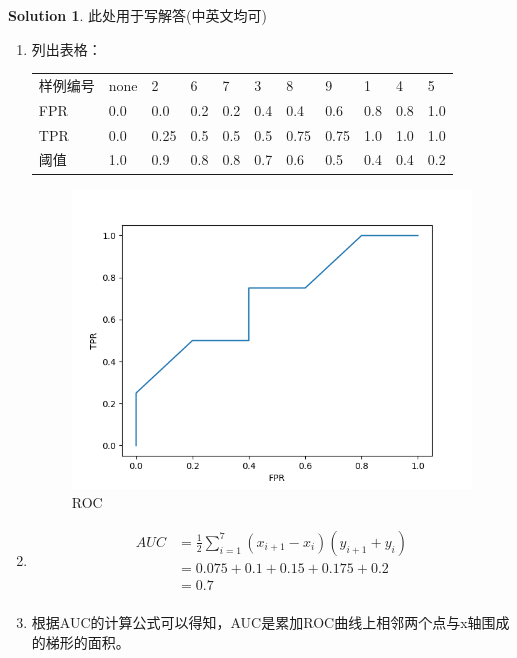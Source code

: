\documentclass[a4paper,UTF8]{article}
\numberwithin{equation}{section}
\theoremstyle{definition}
\newtheorem*{solution}{Solution}
\begin{document}
	\begin{solution}
		此处用于写解答(中英文均可)\\
\begin{enumerate}
\item[(1)]
列出表格：
    \begin{table}[H]
    \label{tab:my-table}
    \begin{tabular}{lllllllllll}
    \cline{1-11}
	样例编号 & none &2 & 6  & 7  & 3 & 8 & 9  & 1  & 4  & 5 \\ \cline{1-11}
    FPR &0.0 & 0.0  & 0.2  & 0.2 & 0.4 & 0.4  & 0.6  & 0.8  & 0.8 & 1.0 \\ \cline{1-11}
    TPR &0.0 & 0.25 & 0.5 & 0.5 & 0.5 & 0.75 & 0.75 & 1.0 & 1.0 & 1.0 \\ \cline{1-11}
    阈值 &1.0 & 0.9  & 0.8  & 0.8 & 0.7 & 0.6  & 0.5  & 0.4  & 0.4 & 0.2 \\ \cline{1-11}
    \end{tabular}
    \end{table}
    \begin{figure}[htbp]
    \centering
    \includegraphics{roc1.jpg}
    \caption{ROC}
    \end{figure}
\newpage 
\item[(2)]
\begin{equation}
	\begin{aligned}
	AUC&= \frac{1}{2}\sum\limits_{i=1}^{7}(x_{i+1}-x_i)(y_{i+1}+y_i) \\
	   &= 0.075+0.1+0.15+0.175+0.2\\
	   &= 0.7 \\
	\end{aligned}
\end{equation}
\item[(3)]
根据AUC的计算公式可以得知，AUC是累加ROC曲线上相邻两个点与x轴围成的梯形的面积。


\end{enumerate}
\end{solution}
\end{document}
